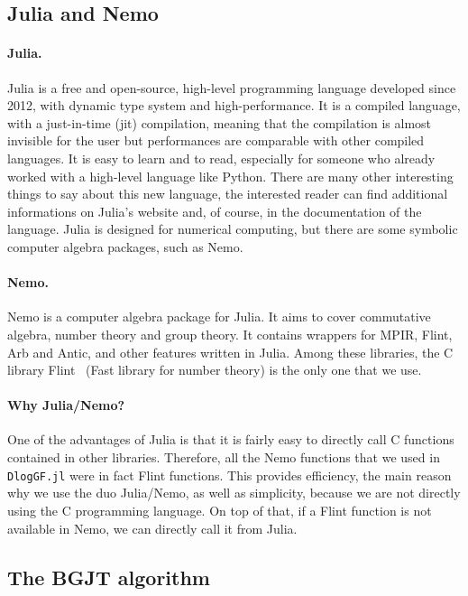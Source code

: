 \documentclass[a4paper,11pt]{article}
\theoremstyle{break}
\theoremstyle{sc}
\theoremstyle{definition}
\theoremstyle{remark}
\begin{document}
\subsection{Julia and Nemo}
\paragraph{Julia.} Julia is a free and open-source, high-level
programming language developed
since 2012, with dynamic type system and high-performance. It is a compiled
language, with a just-in-time (jit) compilation, meaning that the compilation
is almost invisible for the user but performances are comparable with
other compiled languages. It is easy to learn and to read,
especially for someone who already worked with a high-level language like
Python. There are many other interesting things to say about this new
language, the interested reader can find additional informations on Julia's
website and, of course, in the documentation of the language. Julia is designed for numerical computing, but there are some
symbolic computer algebra packages, such as Nemo.

\paragraph{Nemo.} Nemo is a computer algebra package for Julia. It aims to cover
commutative algebra, number theory and group theory. It contains wrappers for
MPIR, Flint, Arb and Antic, and other features written in Julia. Among these
libraries, the C library Flint~\cite{Hart2010flint} (Fast library for number
theory) is the only one that we use.

\paragraph{Why Julia/Nemo?}

One of the advantages of Julia is that it is fairly easy to directly call C
functions contained in other libraries. Therefore, all the Nemo functions
that we used in \texttt{DlogGF.jl} were in fact Flint functions. This
provides efficiency, the main reason why we use the duo Julia/Nemo, as well as
simplicity, because we are not directly using the C programming
language. On top of that, if a Flint function is not available in Nemo, we
can directly call it from Julia.

\subsection{The BGJT algorithm}
\end{document}
